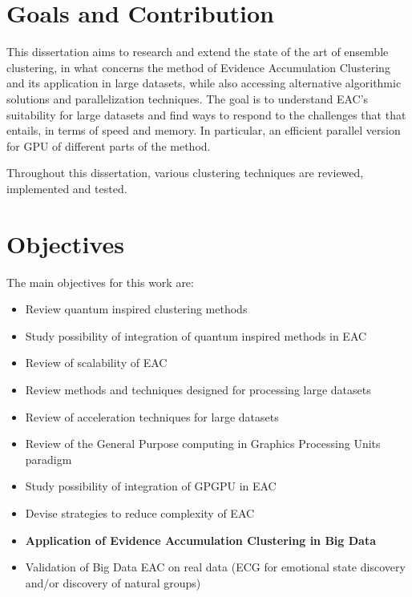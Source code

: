 \section{Goals and Contribution}

This dissertation aims to research and extend the state of the art of ensemble clustering, in what concerns the method of Evidence Accumulation Clustering and its application in large datasets, while also accessing alternative algorithmic solutions and parallelization techniques. The goal is to understand EAC's suitability for large datasets and find ways to respond to the challenges that that entails, in terms of speed and memory. In particular, an efficient parallel version for GPU of different parts of the method.

Throughout this dissertation, various clustering techniques are reviewed, implemented and tested.

\section{Objectives}
The main objectives for this work are:
\begin{itemize}

\item Review quantum inspired clustering methods

\item Study possibility of integration of quantum inspired methods in EAC

\item Review of scalability of EAC

\item Review methods and techniques designed for processing large datasets

\item Review of acceleration techniques for large datasets

\item Review of the General Purpose computing in Graphics Processing Units paradigm

\item Study possibility of integration of GPGPU in EAC

\item Devise strategies to reduce complexity of EAC

\item \textbf{Application of Evidence Accumulation Clustering in Big Data}

\item Validation of Big Data EAC on real data (ECG for emotional state discovery and/or discovery of natural groups)
\end{itemize}


